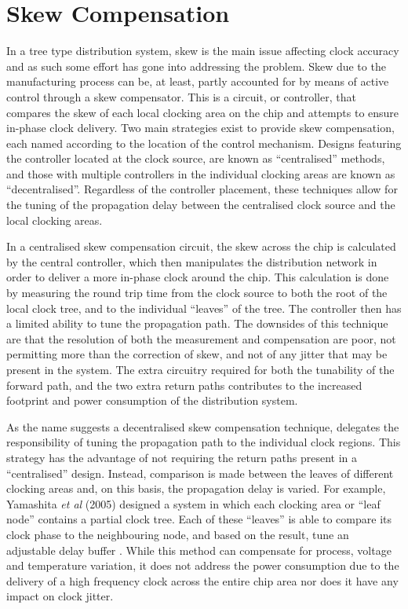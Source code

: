 \section{Skew Compensation}
In a tree type distribution system, skew is the main issue affecting clock accuracy and as such some effort has gone into addressing the problem. Skew due to the manufacturing process can be, at least, partly accounted for by means of active control through a skew compensator. This is a circuit, or controller, that compares the skew of each local clocking area on the chip and attempts to ensure in-phase clock delivery. Two main strategies exist to provide skew compensation, each named according to the location of the control mechanism. Designs featuring the controller located at the clock source, are known as ``centralised'' methods, and those with multiple controllers in the individual clocking areas are known as ``decentralised''. Regardless of the controller placement, these techniques allow for the tuning of the propagation delay between the centralised clock source and the local clocking areas.

In a centralised skew compensation circuit, the skew across the chip is calculated by the central controller, which then manipulates the distribution network in order to deliver a more in-phase clock around the chip. This calculation is done by measuring the round trip time from the clock source to both the root of the local clock tree, and to the individual ``leaves'' of the tree. The controller then has a limited ability to tune the propagation path. The downsides of this technique are that the resolution of both the measurement and compensation are poor, not permitting more than the correction of skew, and not of any jitter that may be present in the system. The extra circuitry required for both the tunability of the forward path, and the two extra return paths contributes to the increased footprint and power consumption of the distribution system.

As the name suggests a decentralised skew compensation technique, delegates the responsibility of tuning the propagation path to the individual clock regions. This strategy has the advantage of not requiring the return paths present in a ``centralised'' design. Instead, comparison is made between the leaves of different clocking areas and, on this basis, the propagation delay is varied.
For example, Yamashita \textit{et al} (2005) designed a system in which each clocking area or ``leaf node'' contains a partial clock tree. Each of these ``leaves'' is able to compare its clock phase to the neighbouring node, and based on the result, tune an adjustable delay buffer \cite{yamashita2005dynamic}. While this method can compensate for process, voltage and temperature variation, it does not address the power consumption due to the delivery of a high frequency clock across the entire chip area nor does it have any impact on clock jitter.

